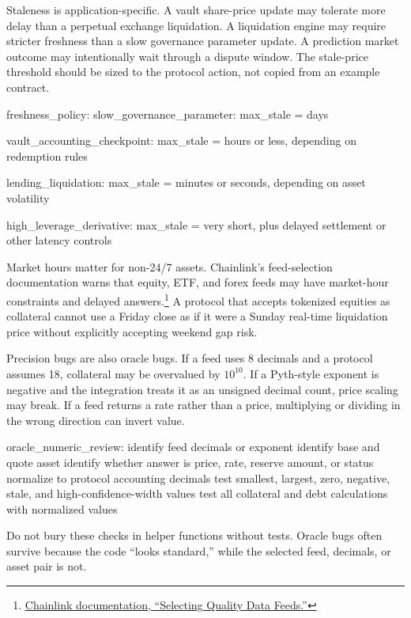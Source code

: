 Staleness is application-specific. A vault share-price update may tolerate more delay than a perpetual exchange liquidation. A liquidation engine may require stricter freshness than a slow governance parameter update. A prediction market outcome may intentionally wait through a dispute window. The stale-price threshold should be sized to the protocol action, not copied from an example contract.

\begin{codeblock}
freshness_policy:
    slow_governance_parameter:
        max_stale = days

    vault_accounting_checkpoint:
        max_stale = hours or less, depending on redemption rules

    lending_liquidation:
        max_stale = minutes or seconds, depending on asset volatility

    high_leverage_derivative:
        max_stale = very short, plus delayed settlement or other latency controls
\end{codeblock}

Market hours matter for non-24/7 assets. Chainlink's feed-selection documentation warns that equity, ETF, and forex feeds may have market-hour constraints and delayed answers.\footnote{\href{https://docs.chain.link/data-feeds/selecting-data-feeds}{Chainlink documentation, ``Selecting Quality Data Feeds.''}} A protocol that accepts tokenized equities as collateral cannot use a Friday close as if it were a Sunday real-time liquidation price without explicitly accepting weekend gap risk.

Precision bugs are also oracle bugs. If a feed uses 8 decimals and a protocol assumes 18, collateral may be overvalued by \(10^{10}\). If a Pyth-style exponent is negative and the integration treats it as an unsigned decimal count, price scaling may break. If a feed returns a rate rather than a price, multiplying or dividing in the wrong direction can invert value.

\begin{codeblock}
oracle_numeric_review:
    identify feed decimals or exponent
    identify base and quote asset
    identify whether answer is price, rate, reserve amount, or status
    normalize to protocol accounting decimals
    test smallest, largest, zero, negative, stale, and high-confidence-width values
    test all collateral and debt calculations with normalized values
\end{codeblock}

Do not bury these checks in helper functions without tests. Oracle bugs often survive because the code ``looks standard,'' while the selected feed, decimals, or asset pair is not.

